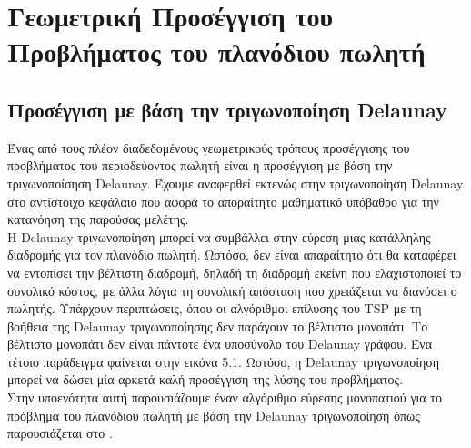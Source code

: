 \documentclass[oneside,12pt]{book}
\theoremstyle{definition}
\begin{document}
\chapter{Γεωμετρική Προσέγγιση του Προβλήματος του πλανόδιου πωλητή}

\section{Προσέγγιση με βάση την τριγωνοποίηση Delaunay}

Ένας από τους πλέον διαδεδομένους γεωμετρικούς τρόπους προσέγγισης του προβλήματος του περιοδεύοντος πωλητή είναι η προσέγγιση με βάση την τριγωνοποίσηση Delaunay. Έχουμε αναφερθεί εκτενώς στην τριγωνοποίηση Delaunay στο αντίστοιχο κεφάλαιο που αφορά το αποραίτητο μαθηματικό υπόβαθρο για την κατανόηση της παρούσας μελέτης. \\

Η Delaunay τριγωνοποίηση μπορεί να συμβάλλει στην εύρεση μιας κατάλληλης διαδρομής για τον πλανόδιο πωλητή. Ωστόσο, δεν είναι απαραίτητο ότι θα καταφέρει να εντοπίσει την βέλτιστη διαδρομή, δηλαδή τη διαδρομή εκείνη που ελαχιστοποιεί το συνολικό κόστος, με άλλα λόγια τη συνολική απόσταση που χρειάζεται να διανύσει ο πωλητής. Υπάρχουν περιπτώσεις, όπου οι αλγόριθμοι επίλυσης του TSP με τη βοήθεια της Delaunay τριγωνοποίησης δεν παράγουν το βέλτιστο μονοπάτι. Το βέλτιστο μονοπάτι δεν είναι πάντοτε ένα υποσύνολο του Delaunay γράφου. Ένα τέτοιο παράδειγμα φαίνεται στην εικόνα 5.1. Ωστόσο, η Delaunay τριγωνοποίηση μπορεί να δώσει μία αρκετά καλή προσέγγιση της λύσης του προβλήματος. \\

Στην υποενότητα αυτή παρουσιάζουμε έναν αλγόριθμο εύρεσης μονοπατιού για το πρόβλημα του πλανόδιου πωλητή με βάση την Delaunay τριγωνοποίηση όπως παρουσιάζεται στο \cite{10}. \\
\end{document}
